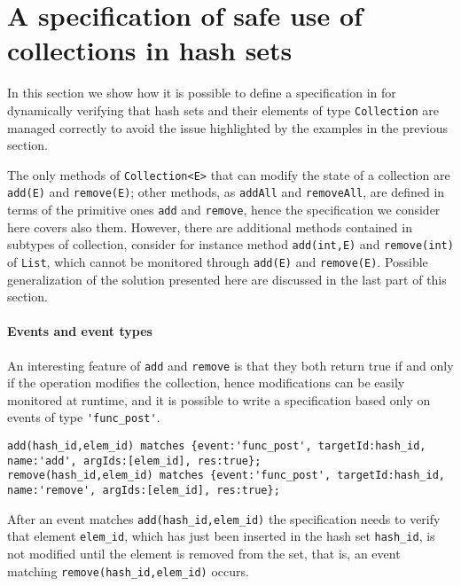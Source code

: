 \section{A specification of safe use of collections in hash sets}
In this section we show how it is possible to define a specification in \rml for dynamically verifying that hash sets and their elements of
type \lstinline{Collection} are managed correctly to avoid the issue highlighted by the examples in the previous section.

The only methods of \lstinline{Collection<E>} that can modify the state of a collection are \lstinline{add(E)} and \lstinline{remove(E)}; other methods, as \lstinline{addAll} and \lstinline{removeAll}, are defined in terms of the primitive ones \lstinline{add} and \lstinline{remove}, hence the specification we consider here covers also them. However, there are additional methods contained in subtypes of collection, consider for instance method
\lstinline{add(int,E)} and \lstinline{remove(int)} of \lstinline{List}, which cannot be monitored through \lstinline{add(E)} and \lstinline{remove(E)}. Possible generalization of the solution presented here are discussed in the last part of this section.

\paragraph{Events and event types} An interesting feature of \lstinline{add} and \lstinline{remove} is that they both return true if and only if the operation modifies the collection, hence modifications can be easily monitored at runtime, and it is possible to write a specification based only on events of type \lstinline{'func_post'}.

\begin{lstlisting}[basicstyle=\ttfamily\scriptsize]
add(hash_id,elem_id) matches {event:'func_post', targetId:hash_id, name:'add', argIds:[elem_id], res:true};
remove(hash_id,elem_id) matches {event:'func_post', targetId:hash_id, name:'remove', argIds:[elem_id], res:true};
\end{lstlisting}

After an event matches \lstinline{add(hash_id,elem_id)} the specification needs to verify that 
element \lstinline{elem_id}, which has just been inserted in the hash set \lstinline{hash_id}, is not modified 
until the element is removed from the set, that is, an event matching \lstinline{remove(hash_id,elem_id)} occurs.


